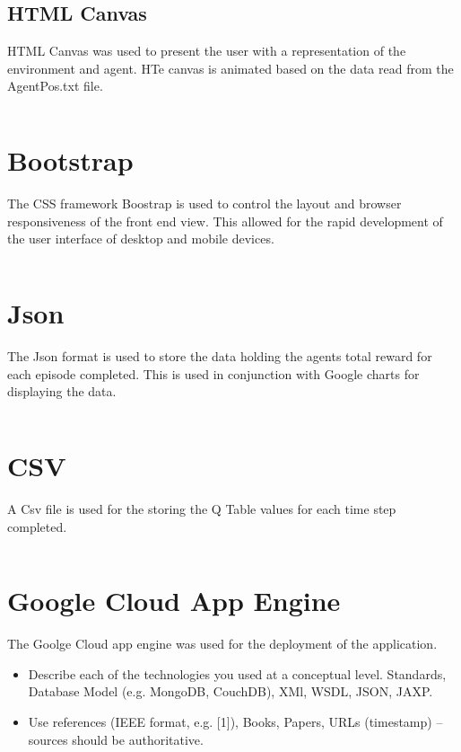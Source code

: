 \subsection{HTML Canvas}
HTML Canvas was used to present the user with a representation of the environment and agent. HTe canvas is animated based on the data read from the AgentPos.txt file.
\begin{verbatim}

\end{verbatim}

\section{Bootstrap} 
The CSS framework Boostrap is used to control the layout and browser responsiveness of the front end view. This allowed for the rapid development of the user interface of desktop and mobile devices.
\begin{verbatim}

\end{verbatim}
\section{Json}
The Json format is used to store the data holding  the agents total reward for each episode completed.
This is used in conjunction with Google charts for displaying the data.
\begin{verbatim}

\end{verbatim}
\section{CSV}
A Csv file is used for the storing the Q Table values for each time step completed.
\begin{verbatim}

\end{verbatim}
\section{Google Cloud App Engine}
The Goolge Cloud app engine was used for the deployment of the application. 
\begin{itemize}
\item Describe each of the technologies you used at a conceptual level. Standards, Database Model (e.g. MongoDB, CouchDB), XMl, WSDL, JSON, JAXP.
\item Use references (IEEE format, e.g. [1]), Books, Papers, URLs (timestamp) – sources should be authoritative. 
\end{itemize}

